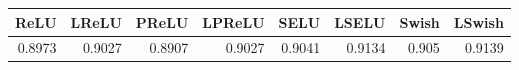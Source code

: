 \begin{tabular}{rrrrrrrr}
\toprule
   ReLU &   LReLU &   PReLU &  LPReLU &    SELU &   LSELU &  Swish &  LSwish \\
\midrule
 0.8973 &  0.9027 &  0.8907 &  0.9027 &  0.9041 &  0.9134 &  0.905 &  0.9139 \\
\bottomrule
\end{tabular}
